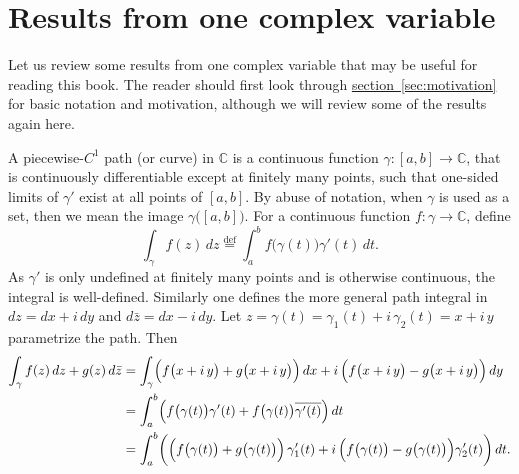 \documentclass[12pt,openany]{book}
\newcommand{\C}{{\mathbb{C}}}
\theoremstyle{plain}
\theoremstyle{remark}
\theoremstyle{definition}
\theoremstyle{exercise}
\theoremstyle{example}
\newcommand{\sectionref}[1]{\hyperref[#1]{section~\ref*{#1}}}
\begin{document}

\chapter{Results from one complex variable} \label{ap:onevarresults}


Let us review some results from one complex variable that may be useful for
reading this book.
The reader should first look through \sectionref{sec:motivation}
for basic notation and motivation, although we will review some of the
results again here.

A piecewise-$C^1$ path (or curve) in $\C$
is a continuous function $\gamma \colon [a,b] \to \C$,
that is continuously differentiable except at finitely many points,
such that one-sided limits of $\gamma'$ exist at all points of $[a,b]$.
By abuse of notation, when $\gamma$ is used as a set, then we mean
the image
$\gamma\bigl([a,b]\bigr)$.
For a continuous function $f \colon \gamma \to \C$, define
%
\begin{equation*}
\int_\gamma f(z) \, dz 
\overset{\text{def}}{=}
\int_a^b f\bigl(\gamma(t)\bigr) \gamma'(t) \, dt .
\end{equation*}
As $\gamma'$ is only undefined at finitely many points and is otherwise
continuous, the integral is well-defined.  Similarly one defines the more general
path integral in $dz = dx + i\,dy$ and $d\bar{z} = dx - i\, dy$.
Let
$z = \gamma(t) = \gamma_1(t) + i \, \gamma_2(t) = x + i\, y$
parametrize the path.  Then
\begin{equation*}
\begin{split}
\int_\gamma f(z) \, dz + g(z) \, d\bar{z}
& =
\int_\gamma
\Bigl(f\bigl(x+i\, y\bigr) + g\bigl(x+i\, y\bigr) \Bigr) \, dx
+
i \, \Bigl( f\bigl(x+i\, y\bigr) - g\bigl(x+i\, y\bigr) \Bigr) \, dy
\\
& =
\int_a^b
\Bigl(
f\bigl(\gamma(t)\bigr) \gamma'(t)
+
f\bigl(\gamma(t)\bigr) \overline{\gamma'(t)}
\Bigr) \, dt
\\
& =
\int_a^b
\biggl(
\Bigl(f\bigl(\gamma(t)\bigr) + g\bigl(\gamma(t)\bigr) \Bigr) \,
\gamma_1'(t)
+
i \, \Bigl( f\bigl(\gamma(t)\bigr) - g\bigl(\gamma(t)\bigr) \Bigr)
\gamma_2'(t)
\biggr)
\, dt .
\end{split}
\end{equation*}
\end{document}
